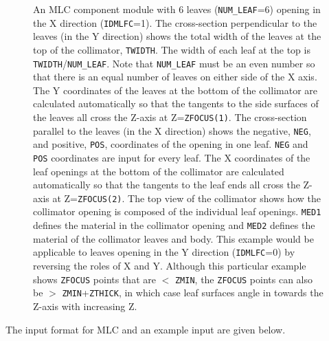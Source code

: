 \documentclass[12pt,twoside]{article}
\begin{document}
\begin{figure}[tp]
\begin{center}
\begin{htmlonly}
\end{htmlonly}
\end{center}
\caption[MLC CM geometry]
{An MLC component module with 6 leaves ({\tt NUM\_LEAF}=6) opening in the X
direction ({\tt IDMLFC}=1).  The cross-section perpendicular to the leaves
(in the Y direction) shows the total width of the leaves at
the top of the collimator, {\tt TWIDTH}.  The width of each leaf at the top
is {\tt TWIDTH}/{\tt NUM\_LEAF}.  Note that {\tt NUM\_LEAF} must be
an even number so that there is an equal number of leaves on either side
of the X axis.  The Y coordinates of the leaves
at the bottom of the collimator are calculated automatically so that
the tangents to the
side surfaces of the leaves all cross the Z-axis at Z={\tt ZFOCUS(1)}.  The
cross-section parallel to the leaves (in the X direction) shows the negative,
{\tt NEG},
and positive, {\tt POS}, coordinates of the opening in one leaf.
{\tt NEG} and {\tt POS} coordinates are input for every leaf.
The X coordinates
of the leaf openings at the bottom of the collimator are calculated
automatically so that the tangents to the leaf ends all cross the Z-axis at
Z={\tt ZFOCUS(2)}.  The
top view of the collimator shows how the collimator opening is composed
of the individual leaf openings.  {\tt MED1} defines the material in the collimator
opening and {\tt MED2} defines the material of the collimator leaves and body.
This example would be applicable to leaves opening
in the Y direction ({\tt IDMLFC}=0) by reversing the roles of X and Y.  Although this
particular example shows {\tt ZFOCUS} points that are $<$ {\tt ZMIN}, the {\tt ZFOCUS}
points can also be $>$ {\tt ZMIN}+{\tt ZTHICK}, in which case leaf surfaces angle
in towards the Z-axis with increasing Z.}
\label{fig_MLCD}
\end{figure}


\clearpage

The input format for MLC and an example input are given below.
\begin{small}

\end{small}


\clearpage

\end{document}

